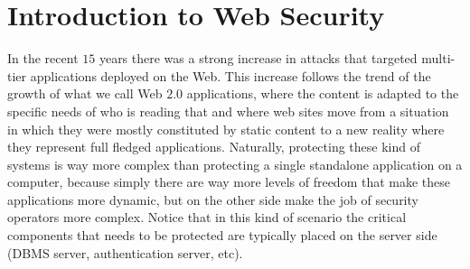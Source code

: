 \section{Introduction to Web Security}
In the recent $15$ years there was a strong increase in attacks that targeted multi-tier applications deployed on the Web. This increase follows the trend of the growth of what we call Web $2.0$ applications, where the content is adapted to the specific needs of who is reading that and where web sites move from a situation in which they were mostly constituted by static content to a new reality where they represent full fledged applications. Naturally, protecting these kind of systems is way more complex than protecting a single standalone application on a computer, because simply there are way more levels of freedom that make these applications more dynamic, but on the other side make the job of security operators more complex. Notice that in this kind of scenario the critical components that needs to be protected are typically placed on the server side (DBMS server, authentication server, etc).

